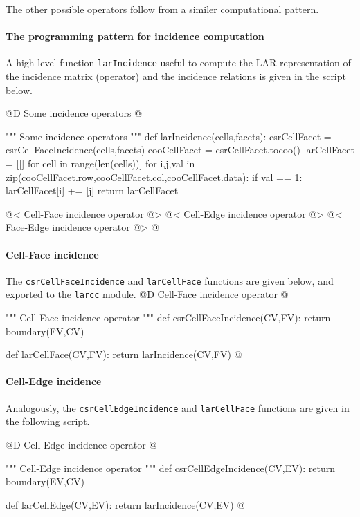 \documentclass[11pt,oneside]{article}    %
\begin{document}
The other possible operators follow from a similer computational pattern.

\paragraph{The programming pattern for incidence computation}

A high-level function \texttt{larIncidence} useful to compute the LAR representation of the incidence matrix (operator) and the incidence relations is given in the script below.

@D Some incidence operators
@{""" Some incidence operators """
def larIncidence(cells,facets):
    csrCellFacet = csrCellFaceIncidence(cells,facets)
    cooCellFacet = csrCellFacet.tocoo()
    larCellFacet = [[] for cell in range(len(cells))]
    for i,j,val in zip(cooCellFacet.row,cooCellFacet.col,cooCellFacet.data):
        if val == 1: larCellFacet[i] += [j]
    return larCellFacet

@< Cell-Face incidence operator @>
@< Cell-Edge incidence operator @>
@< Face-Edge incidence operator @>
@}


\paragraph{Cell-Face incidence}
The \texttt{csrCellFaceIncidence} and \texttt{larCellFace} functions are given below, and exported to the \texttt{larcc} module.
@D Cell-Face incidence operator
@{""" Cell-Face incidence operator """
def csrCellFaceIncidence(CV,FV):
    return boundary(FV,CV)

def larCellFace(CV,FV):
    return larIncidence(CV,FV)
@}

\paragraph{Cell-Edge incidence}
Analogously, the \texttt{csrCellEdgeIncidence} and \texttt{larCellFace} functions are given in the following script.

@D Cell-Edge incidence operator
@{""" Cell-Edge incidence operator """
def csrCellEdgeIncidence(CV,EV):
     return boundary(EV,CV)

def larCellEdge(CV,EV):
    return larIncidence(CV,EV)
@}
\end{document}
